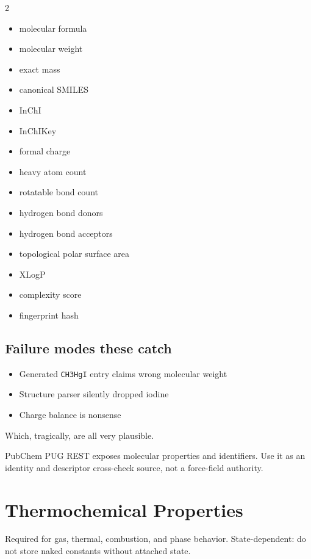 \documentclass[11pt, a4paper]{article}
\begin{document}
\begin{multicols}{2}
\begin{itemize}[itemsep=1pt, leftmargin=*]
  \item molecular formula
  \item molecular weight
  \item exact mass
  \item canonical SMILES
  \item InChI
  \item InChIKey
  \item formal charge
  \item heavy atom count
  \item rotatable bond count
  \item hydrogen bond donors
  \item hydrogen bond acceptors
  \item topological polar surface area
  \item XLogP
  \item complexity score
  \item fingerprint hash
\end{itemize}
\end{multicols}

\subsection{Failure modes these catch}

\begin{itemize}[itemsep=1pt, leftmargin=*]
  \item Generated \texttt{CH3HgI} entry claims wrong molecular weight
  \item Structure parser silently dropped iodine
  \item Charge balance is nonsense
\end{itemize}

Which, tragically, are all very plausible.

PubChem PUG REST exposes molecular properties and identifiers. Use it as an identity and descriptor cross-check source, not a force-field authority.

\section{Thermochemical Properties}

Required for gas, thermal, combustion, and phase behavior. State-dependent: do not store naked constants without attached state.
\end{document}
